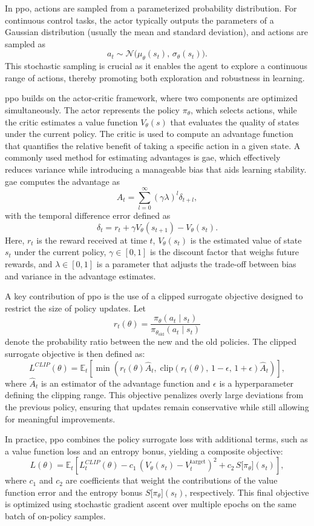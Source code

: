 In \gls{ppo}, actions are sampled from a parameterized probability distribution. For continuous control tasks, the actor typically outputs the parameters of a Gaussian distribution (usually the mean and standard deviation), and actions are sampled as
\[
a_t \sim \mathcal{N}\big(\mu_\theta(s_t),\, \sigma_\theta(s_t)\big).
\]
This stochastic sampling is crucial as it enables the agent to explore a continuous range of actions, thereby promoting both exploration and robustness in learning.

\gls{ppo} builds on the actor-critic framework, where two components are optimized simultaneously. The actor represents the policy \(\pi_\theta\), which selects actions, while the critic estimates a value function \(V_\theta(s)\) that evaluates the quality of states under the current policy. The critic is used to compute an advantage function that quantifies the relative benefit of taking a specific action in a given state. A commonly used method for estimating advantages is \gls{gae}, which effectively reduces variance while introducing a manageable bias that aids learning stability. \gls{gae} computes the advantage as
\[
\hat{A}_t = \sum_{l=0}^{\infty} (\gamma \lambda)^l \delta_{t+l},
\]
with the temporal difference error defined as
\[
\delta_t = r_t + \gamma V_\theta(s_{t+1}) - V_\theta(s_t).
\]
Here, \(r_t\) is the reward received at time \(t\), \(V_\theta(s_t)\) is the estimated value of state \(s_t\) under the current policy, \(\gamma \in [0,1]\) is the discount factor that weighs future rewards, and \(\lambda \in [0,1]\) is a parameter that adjusts the trade-off between bias and variance in the advantage estimates.

A key contribution of \gls{ppo} is the use of a clipped surrogate objective designed to restrict the size of policy updates. Let
\[
r_t(\theta) = \frac{\pi_\theta(a_t \mid s_t)}{\pi_{\theta_{\text{old}}}(a_t \mid s_t)}
\]
denote the probability ratio between the new and the old policies. The clipped surrogate objective is then defined as:
\[
L^{CLIP}(\theta) = \mathbb{E}_t\!\left[\min\!\left(r_t(\theta)\hat{A}_t,\;\text{clip}\left(r_t(\theta),\,1-\epsilon,\,1+\epsilon\right)\hat{A}_t\right)\right],
\]
where \(\hat{A}_t\) is an estimator of the advantage function and \(\epsilon\) is a hyperparameter defining the clipping range. This objective penalizes overly large deviations from the previous policy, ensuring that updates remain conservative while still allowing for meaningful improvements.

In practice, \gls{ppo} combines the policy surrogate loss with additional terms, such as a value function loss and an entropy bonus, yielding a composite objective:
\[
L(\theta) = \mathbb{E}_t \left[ L^{CLIP}_t(\theta) - c_1\, \left(V_\theta(s_t) - V_t^{\text{target}}\right)^2 + c_2\, S\big[\pi_\theta\big](s_t) \right],
\]
where \(c_1\) and \(c_2\) are coefficients that weight the contributions of the value function error and the entropy bonus \(S\big[\pi_\theta\big](s_t)\), respectively. This final objective is optimized using stochastic gradient ascent over multiple epochs on the same batch of on-policy samples.

